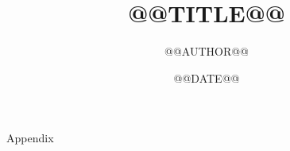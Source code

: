 \documentclass{beamer}
\title{@@TITLE@@}
\author{@@AUTHOR@@}
\date{@@DATE@@}
\begin{document}
\begin{frame}{\inserttitle}

\end{frame}
\appendix
\begin{frame}{Appendix}

\end{frame}
\end{document}
